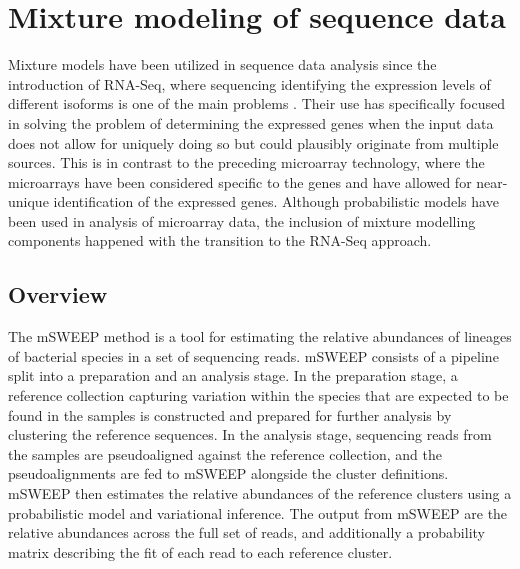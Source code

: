 \documentclass[officiallayout]{tktla}
\begin{document}
\chapter{Mixture modeling of sequence data}


Mixture models have been utilized in sequence data analysis since the
introduction of RNA-Seq, where sequencing identifying the expression
levels of different isoforms is one of the main problems
\citep{garber2011computational, wang2009rna}. Their use has
specifically focused in solving the problem of determining the
expressed genes when the input data does not allow for uniquely doing
so but could plausibly originate from multiple sources. This is in
contrast to the preceding microarray technology, where the microarrays
have been considered specific to the genes and have allowed for
near-unique identification of the expressed genes. Although
probabilistic models have been used in analysis of microarray data,
the inclusion of mixture modelling components happened with the
transition to the RNA-Seq approach.

\section{Overview}

The mSWEEP method is a tool for estimating the relative abundances of
lineages of bacterial species in a set of sequencing reads. mSWEEP
consists of a pipeline split into a preparation and an analysis
stage. In the preparation stage, a reference collection capturing
variation within the species that are expected to be found in the
samples is constructed and prepared for further analysis by clustering
the reference sequences. In the analysis stage, sequencing reads from
the samples are pseudoaligned against the reference collection, and
the pseudoalignments are fed to mSWEEP alongside the cluster
definitions. mSWEEP then estimates the relative abundances of the
reference clusters using a probabilistic model and variational
inference. The output from mSWEEP are the relative abundances across
the full set of reads, and additionally a probability matrix
describing the fit of each read to each reference cluster.
\end{document}
